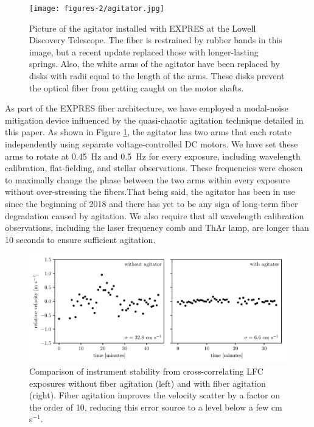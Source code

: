 \begin{figure}
    \centering
    \texttt{[image: figures-2/agitator.jpg]}
    \caption{Picture of the agitator installed with EXPRES at the Lowell Discovery Telescope. The fiber is restrained by rubber bands in this image, but a recent update replaced those with longer-lasting springs. Also, the white arms of the agitator have been replaced by disks with radii equal to the length of the arms. These disks prevent the optical fiber from getting caught on the motor shafts.}
    \label{fig:agitator}
\end{figure}

As part of the EXPRES fiber architecture, we have employed a modal-noise mitigation device influenced by the quasi-chaotic agitation technique detailed in this paper. As shown in Figure \ref{fig:agitator}, the agitator has two arms that each rotate independently using separate voltage-controlled DC motors. We have set these arms to rotate at \SI{0.45}{\hertz} and \SI{0.5}{\hertz} for every exposure, including wavelength calibration, flat-fielding, and stellar observations. These frequencies were chosen to maximally change the phase between the two arms within every exposure without over-stressing the fibers.That being said, the agitator has been in use since the beginning of 2018 and there has yet to be any sign of long-term fiber degradation caused by agitation. We also require that all wavelength calibration observations, including the laser frequency comb and ThAr lamp, are longer than 10 seconds to ensure sufficient agitation. 

\begin{figure}
    \centering
    \includegraphics[width=\textwidth]{figures-2/lfc_agitator_comp.pdf}
    \caption{Comparison of instrument stability from cross-correlating LFC exposures without fiber agitation (left) and with fiber agitation (right). Fiber agitation improves the velocity scatter by a factor on the order of 10, reducing this error source to a level below a few cm s$^{-1}$. \citep[Image and caption reprinted from][]{blackman_performance_2020}}
    \label{fig:lfc-agitator-comp}
\end{figure}

